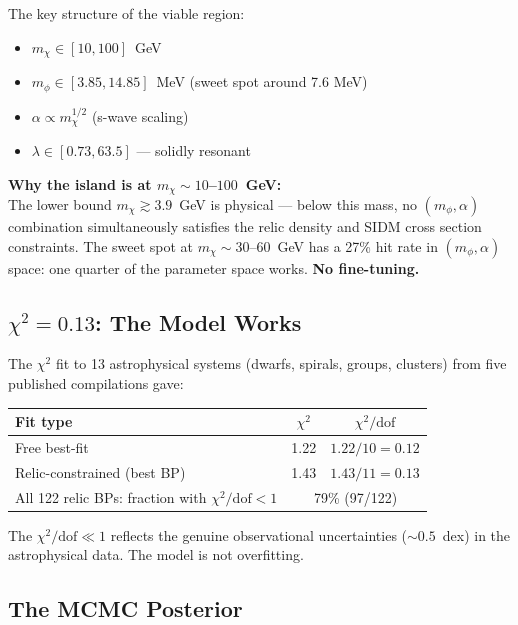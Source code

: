 \documentclass[12pt, a4paper]{article}
\begin{document}
The key structure of the viable region:
\begin{itemize}
  \item $m_\chi \in [10, 100]$~GeV
  \item $m_\phi \in [3.85, 14.85]$~MeV (sweet spot around 7.6 MeV)
  \item $\alpha \propto m_\chi^{1/2}$ (s-wave scaling)
  \item $\lambda \in [0.73, 63.5]$ --- solidly resonant
\end{itemize}

\begin{insightbox}
\textbf{Why the island is at $m_\chi \sim 10$--$100$~GeV:}\\
The lower bound $m_\chi \gtrsim 3.9$~GeV is physical --- below this mass, no $(m_\phi, \alpha)$ combination 
simultaneously satisfies the relic density and SIDM cross section constraints.
The sweet spot at $m_\chi \sim 30$--$60$~GeV has a 27\% hit rate in $(m_\phi, \alpha)$ space:
one quarter of the parameter space works. \textbf{No fine-tuning.}
\end{insightbox}

\subsection{$\chi^2 = 0.13$: The Model Works}

The $\chi^2$ fit to 13 astrophysical systems (dwarfs, spirals, groups, clusters) from five published compilations gave:

\begin{center}
\begin{tabular}{lcc}
  \toprule
  Fit type & $\chi^2$ & $\chi^2/\text{dof}$ \\
  \midrule
  Free best-fit & 1.22 & $1.22/10 = 0.12$ \\
  Relic-constrained (best BP) & 1.43 & $1.43/11 = 0.13$ \\
  All 122 relic BPs: fraction with $\chi^2/\text{dof} < 1$ & \multicolumn{2}{c}{79\% (97/122)} \\
  \bottomrule
\end{tabular}
\end{center}

The $\chi^2/\text{dof} \ll 1$ reflects the genuine observational uncertainties ($\sim 0.5$~dex) in the astrophysical data. The model is not overfitting.

\subsection{The MCMC Posterior}
\end{document}
